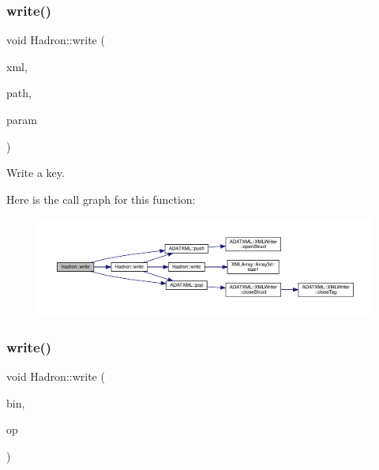 \subsubsection{\texorpdfstring{write()}{write()}\hspace{0.1cm}{\footnotesize\ttfamily [87/95]}}
{\footnotesize\ttfamily void Hadron\+::write (\begin{DoxyParamCaption}\item[{\mbox{\hyperlink{classADATXML_1_1XMLWriter}{X\+M\+L\+Writer}} \&}]{xml,  }\item[{const std\+::string \&}]{path,  }\item[{const \mbox{\hyperlink{structHadron_1_1SingleHadronQuarkDeriv__t}{Single\+Hadron\+Quark\+Deriv\+\_\+t}} \&}]{param }\end{DoxyParamCaption})}



Write a key. 

Here is the call graph for this function\+:\nopagebreak
\begin{figure}[H]
\begin{center}
\leavevmode
\includegraphics[width=350pt]{d1/daf/namespaceHadron_a2e0c9a892aa8790addf90c28db1eaf28_cgraph}
\end{center}
\end{figure}
\mbox{\label{namespaceHadron_aca06b6220f81ed284c829138c237b84e}} 
\subsubsection{\texorpdfstring{write()}{write()}\hspace{0.1cm}{\footnotesize\ttfamily [88/95]}}
{\footnotesize\ttfamily void Hadron\+::write (\begin{DoxyParamCaption}\item[{\mbox{\hyperlink{classADATIO_1_1BinaryWriter}{Binary\+Writer}} \&}]{bin,  }\item[{const \mbox{\hyperlink{structHadron_1_1SingleHadronQuarkDeriv__t}{Single\+Hadron\+Quark\+Deriv\+\_\+t}} \&}]{op }\end{DoxyParamCaption})}




